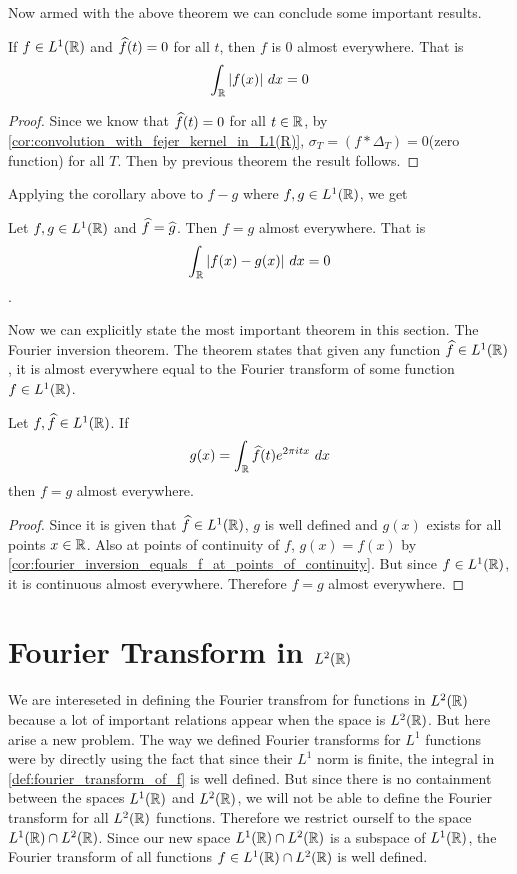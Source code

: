 Now armed with the above theorem we can conclude some important results.
\begin{corollary}
  If $f\in L^1(\mathbb R)$ and $\widehat{f}(t) = 0$ for all $t$, then $f$ is $0$ almost everywhere. That is $$\int_\R |f(x)| \ dx = 0$$
\end{corollary}
\begin{proof}
  Since we know that $\widehat{f}(t)= 0$ for all $t\in \mathbb R$, by \autoref{cor:convolution_with_fejer_kernel_in_L1(R)}, $\sigma_T = (f*\Delta_T) =0$(zero function) for all $T$. Then by previous theorem the result follows. 
\end{proof}

Applying the corollary above to $f-g$ where $f, g \in L^1(\mathbb R)$, we get
\begin{corollary}
  \label{cor:functions_with_same_fourier_transform_in_R}
  Let $f, g \in L^1(\mathbb R)$ and $\widehat{f} = \widehat{g}$. Then $f=g$ almost everywhere. That is $$\int_\mathbb R |f(x) - g(x)| \ dx = 0$$.
\end{corollary}

  Now we can explicitly state the most important theorem in this section. The Fourier inversion theorem. The theorem states that given any function $\widehat{f} \in L^1(\mathbb R)$, it is almost everywhere equal to the Fourier transform of some function $f \in L^1(\mathbb R)$.
\begin{theorem}
  \label{thm:fourier_inversion_in_L1}
  Let $f, \widehat{f} \in L^1(\mathbb R)$. If$$g(x) = \int_\R \hatf(t) e^{2\pi itx} \ dx$$
  then $f=g$ almost everywhere.
\end{theorem}
\begin{proof}
  Since it is given that $\widehat{f} \in L^1(\mathbb R)$, $g$ is well defined and $g(x)$ exists for all points $x \in \mathbb R$. Also at points of continuity of $f$, $g(x) = f(x)$ by \autoref{cor:fourier_inversion_equals_f_at_points_of_continuity}. But since $f \in L^1(\mathbb R)$, it is continuous almost everywhere. Therefore $f = g$ almost everywhere. 

\end{proof}


\section{Fourier Transform in $L^2(\mathbb R)$}
We are intereseted in defining the Fourier transfrom for functions in $L^2(\mathbb R)$ because a lot of important relations appear when the space is $L^2(\mathbb R)$. But here arise a new problem. The way we defined Fourier transforms for $L^1$ functions were by directly using the fact that since their $L^1$ norm is finite, the integral in \autoref{def:fourier_transform_of_f} is well defined. But since there is no containment between the spaces $L^1(\mathbb R)$ and $L^2(\mathbb R)$, we will not be able to define the Fourier transform for all $L^2(\mathbb R)$ functions. Therefore we restrict ourself to the space $L^1(\mathbb R) \cap L^2(\mathbb R)$. 
Since our new space $L^1(\mathbb R) \cap L^2(\mathbb R)$ is a subspace of $L^1(\mathbb R)$, the Fourier transform of all functions $f \in L^1(\mathbb R) \cap L^2(\mathbb R)$ is well defined. 

